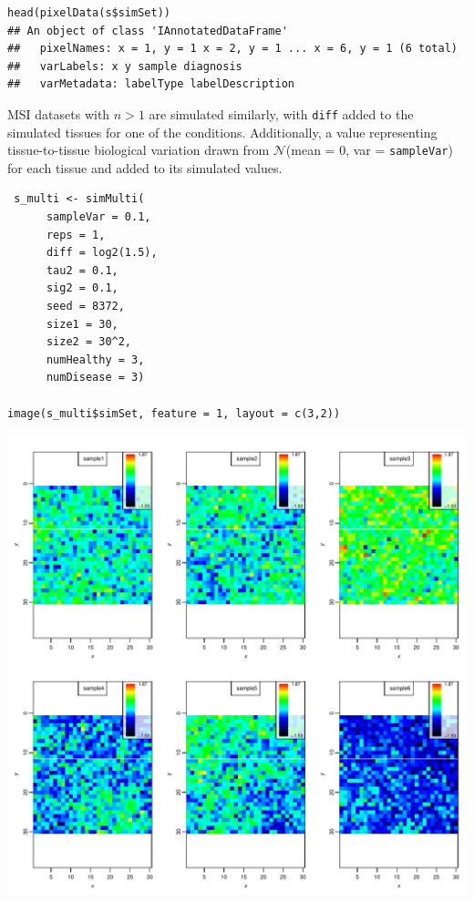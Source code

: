 \documentclass[a4paper]{article}\usepackage[]{graphicx}\usepackage[]{color}
\makeatletter
\def\maxwidth{ %
  \ifdim\Gin@nat@width>\linewidth
    \linewidth
  \else
    \Gin@nat@width
  \fi
}
\newenvironment{kframe}{%
 \def\at@end@of@kframe{}%
 \ifinner\ifhmode%
  \def\at@end@of@kframe{\end{minipage}}%
  \begin{minipage}{\columnwidth}%
 \fi\fi%
 \def\FrameCommand##1{\hskip\@totalleftmargin \hskip-\fboxsep
 \colorbox{shadecolor}{##1}\hskip-\fboxsep
     \hskip-\linewidth \hskip-\@totalleftmargin \hskip\columnwidth}%
 \MakeFramed {\advance\hsize-\width
   \@totalleftmargin\z@ \linewidth\hsize
   \@setminipage}}%
 {\par\unskip\endMakeFramed%
 \at@end@of@kframe}
\newenvironment{knitrout}{}{} %
\makeatother
\begin{document}
\begin{knitrout}
\color{fgcolor}\begin{kframe}
\begin{verbatim}
head(pixelData(s$simSet))
## An object of class 'IAnnotatedDataFrame'
##   pixelNames: x = 1, y = 1 x = 2, y = 1 ... x = 6, y = 1 (6 total)
##   varLabels: x y sample diagnosis
##   varMetadata: labelType labelDescription
\end{verbatim}
\end{kframe}
\end{knitrout}

MSI datasets with $n>1$ are simulated similarly, with \texttt{diff} added to the simulated tissues for one of the conditions. Additionally, a value representing tissue-to-tissue biological variation drawn from $\mathcal{N}$(mean = 0, var = \texttt{sampleVar}) for each tissue and added to its simulated values.

\begin{knitrout}
\color{fgcolor}\begin{kframe}
\begin{verbatim}
 s_multi <- simMulti(
      sampleVar = 0.1,
      reps = 1,
      diff = log2(1.5),
      tau2 = 0.1,
      sig2 = 0.1,
      seed = 8372,
      size1 = 30,
      size2 = 30^2,
      numHealthy = 3,
      numDisease = 3)

image(s_multi$simSet, feature = 1, layout = c(3,2))
\end{verbatim}
\end{kframe}

{\centering \includegraphics[width=\maxwidth]{figure/unnamed-chunk-7-1} 

}



\end{knitrout}
\end{document}
